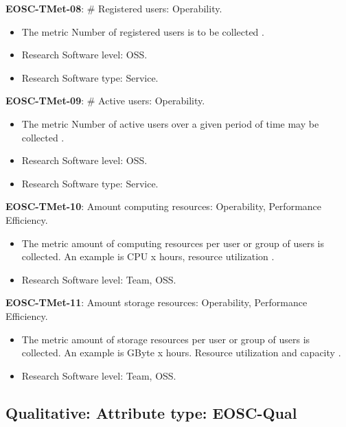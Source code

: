 \textbf{EOSC-TMet-08}: \# Registered users: Operability.

\begin{itemize}
    \item The metric Number of registered users is to be collected \cite{orviz_fernandez_eosc-synergy_2020}.
    \item Research Software level: OSS.
    \item Research Software type: Service.
\end{itemize}

\textbf{EOSC-TMet-09}: \# Active users: Operability.

\begin{itemize}
    \item The metric Number of active users over a given period of time may be collected \cite{orviz_fernandez_eosc-synergy_2020}.
    \item Research Software level: OSS.
    \item Research Software type: Service.
\end{itemize}

\textbf{EOSC-TMet-10}: Amount computing resources: Operability, Performance Efficiency.

\begin{itemize}
    \item The metric amount of computing resources per user or group of users is collected. An example is CPU x hours, resource utilization \cite{iso_25010_2011_2017,orviz_fernandez_eosc-synergy_2020}.
    \item Research Software level: Team, OSS.
\end{itemize}

\textbf{EOSC-TMet-11}: Amount storage resources: Operability, Performance Efficiency.

\begin{itemize}
    \item The metric amount of storage resources per user or group of users is collected. An example is GByte x hours. Resource utilization and capacity \cite{iso_25010_2011_2017,orviz_fernandez_eosc-synergy_2020}.
    \item Research Software level: Team, OSS.
\end{itemize}

\subsection{Qualitative: Attribute type: EOSC-Qual}

